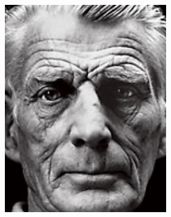 \begin{figure}
    \centering
    \begin{subfigure}{0.23\textwidth}
        \centering
        \includegraphics[width=\textwidth]{statistical_normals/images/gsfs_results/celebrities/samuel_beckett.png}
    \end{subfigure}
    \begin{subfigure}{0.23\textwidth}
        \centering

\end{subfigure}
\end{figure}
